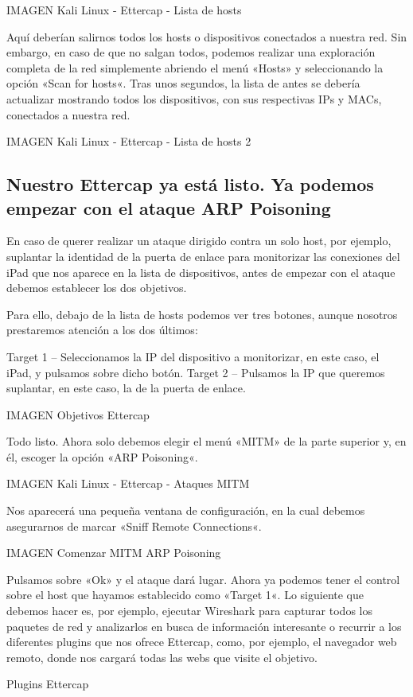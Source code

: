 IMAGEN Kali Linux - Ettercap - Lista de hosts

Aquí deberían salirnos todos los hosts o dispositivos conectados a nuestra red. Sin embargo, en caso de que no salgan todos, podemos realizar una exploración completa de la red simplemente abriendo el menú «Hosts» y seleccionando la opción «Scan for hosts«. Tras unos segundos, la lista de antes se debería actualizar mostrando todos los dispositivos, con sus respectivas IPs y MACs, conectados a nuestra red.

IMAGEN Kali Linux - Ettercap - Lista de hosts 2

\subsection{Nuestro Ettercap ya está listo. Ya podemos empezar con el ataque ARP Poisoning}

En caso de querer realizar un ataque dirigido contra un solo host, por ejemplo, suplantar la identidad de la puerta de enlace para monitorizar las conexiones del iPad que nos aparece en la lista de dispositivos, antes de empezar con el ataque debemos establecer los dos objetivos.

Para ello, debajo de la lista de hosts podemos ver tres botones, aunque nosotros prestaremos atención a los dos últimos:

    Target 1 – Seleccionamos la IP del dispositivo a monitorizar, en este caso, el iPad, y pulsamos sobre dicho botón.
    Target 2 – Pulsamos la IP que queremos suplantar, en este caso, la de la puerta de enlace.

IMAGEN Objetivos Ettercap

Todo listo. Ahora solo debemos elegir el menú «MITM» de la parte superior y, en él, escoger la opción «ARP Poisoning«.

IMAGEN Kali Linux - Ettercap - Ataques MITM

Nos aparecerá una pequeña ventana de configuración, en la cual debemos asegurarnos de marcar «Sniff Remote Connections«.

IMAGEN Comenzar MITM ARP Poisoning

Pulsamos sobre «Ok» y el ataque dará lugar. Ahora ya podemos tener el control sobre el host que hayamos establecido como «Target 1«. Lo siguiente que debemos hacer es, por ejemplo, ejecutar Wireshark para capturar todos los paquetes de red y analizarlos en busca de información interesante o recurrir a los diferentes plugins que nos ofrece Ettercap, como, por ejemplo, el navegador web remoto, donde nos cargará todas las webs que visite el objetivo.

Plugins Ettercap
